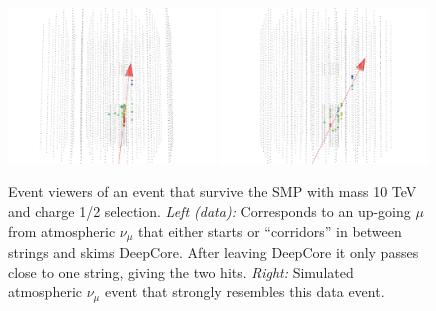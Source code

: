 \begin{appendices}
\begin{figure}
\centering
\includegraphics[width=0.49\textwidth]{appendix/img/FINAL_data_m_10000_ch1ovr2_2.png}
\includegraphics[width=0.49\textwidth]{appendix/img/FINAL_data_m_10000_ch1ovr2_2_NUMUANALOGY.png}
\caption{Event viewers of an event that survive the SMP with mass 10 TeV and charge 1/2 selection. \textit{Left (data): }Corresponds to an up-going $\mu$ from atmospheric $\nu_\mu$ that either starts or ``corridors'' in between strings and skims DeepCore. After leaving DeepCore it only passes close to one string, giving the two hits. \textit{Right: }Simulated atmospheric $\nu_\mu$ event that strongly resembles this data event.}
\label{fig:final_1}
\end{figure}


\end{appendices}
